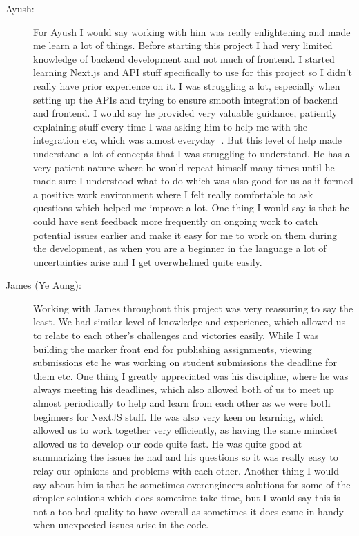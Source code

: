 \documentclass[a4paper, 12pt]{article}
\begin{document}
\begin{enumerate}
\begin{description}
            \item[Ayush: ] For Ayush I would say working with him was really enlightening and made me learn a lot of things. Before starting this project I had very limited knowledge of backend development and not much of frontend. I started learning Next.js and API stuff specifically to use for this project so I didn’t really have prior experience on it. I was struggling a lot, especially when setting up the APIs and trying to ensure smooth integration of backend and frontend. I would say he provided very valuable guidance, patiently explaining stuff every time I was asking him to help me with the integration etc, which was almost everyday . But this level of help made understand a lot of concepts that I was struggling to understand. He has a very patient nature where he would repeat himself many times until he made sure I understood what to do which was also good for us as it formed a positive work environment where I felt really comfortable to ask questions which helped me improve a lot. One thing I would say is that he could have sent feedback more frequently on ongoing work to catch potential issues earlier and make it easy for me to work on them during the development, as when you are a beginner in the language a lot of uncertainties arise and I get overwhelmed quite easily.
            \item[James (Ye Aung): ] Working with James throughout this project was very reassuring to say the least. We had similar level of knowledge and experience, which allowed us to relate to each other’s challenges and victories easily. While I was building the marker front end for publishing assignments, viewing submissions etc he was working on student submissions the deadline for them etc. One thing I greatly appreciated was his discipline, where he was always meeting his deadlines, which also allowed both of us to meet up almost periodically to help and learn from each other as we were both beginners for NextJS stuff. He was also very keen on learning, which allowed us to work together very efficiently, as having the same mindset allowed us to develop our code quite fast. He was quite good at summarizing the issues he had and his questions so it was really easy to relay our opinions and problems with each other. Another thing I would say about him is that he sometimes overengineers solutions for some of the simpler solutions which does sometime take time, but I would say this is not a too bad quality to have overall as sometimes it does come in handy when unexpected issues arise in the code.
        \end{description}
\end{enumerate}
\end{document}
